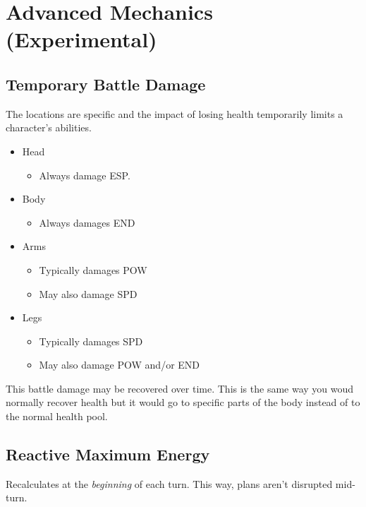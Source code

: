 \part{Advanced Mechanics (Experimental)}
\chapter{Temporary Battle Damage}
The locations are specific and the impact of losing health temporarily limits a character's abilities.
\begin{itemize}
\item Head
\begin{itemize}
\item Always damage ESP.
\end{itemize}
\item Body
\begin{itemize}
\item Always damages END
\end{itemize}
\item Arms
\begin{itemize}
\item Typically damages POW
\item May also damage SPD
\end{itemize}
\item Legs
\begin{itemize}
\item Typically damages SPD
\item May also damage POW and/or END
\end{itemize}
\end{itemize}
This battle damage may be recovered over time. This is the same way you woud normally recover health but it would go to specific parts of the body instead of to the normal health pool.

\chapter{Reactive Maximum Energy}
Recalculates at the \emph{beginning} of each turn. This way, plans
aren't disrupted mid-turn.
